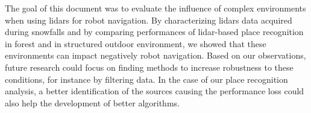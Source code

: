 The goal of this document was to evaluate the influence of complex environments when using \gls*{lidar}s for robot navigation. By characterizing \gls*{lidar}s data acquired during snowfalls and by comparing performances of \gls*{lidar}-based place recognition in forest and in structured outdoor environment, we showed that these environments can impact negatively robot navigation. Based on our observations, future research could focus on finding methods to increase robustness to these conditions, for instance by filtering data. In the case of our place recognition analysis, a better identification of the sources causing the performance loss could also help the development of better algorithms.
